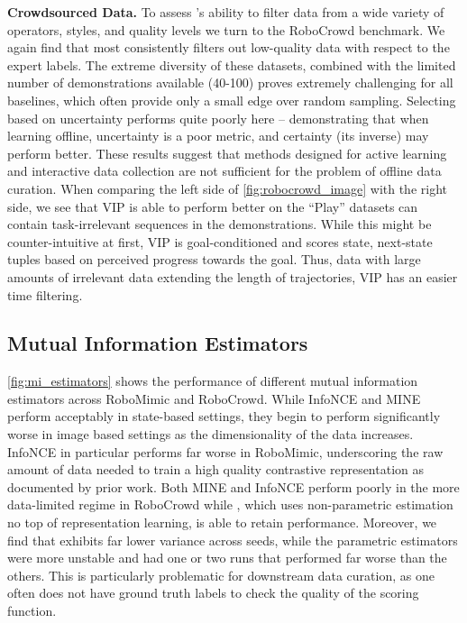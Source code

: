 \noindent \textbf{Crowdsourced Data.}
To assess \abv's ability to filter data from a wide variety of operators, styles, and quality levels we turn to the RoboCrowd benchmark. We again find that \abv most consistently filters out low-quality data with respect to the expert labels. The extreme diversity of these datasets, combined with the limited number of demonstrations available (40-100) proves extremely challenging for all baselines, which often provide only a small edge over random sampling. Selecting based on uncertainty performs quite poorly here -- demonstrating that when learning offline, uncertainty is a poor metric, and certainty (its inverse) may perform better. These results suggest that methods designed for active learning and interactive data collection are not sufficient for the problem of offline data curation. When comparing the left side of \cref{fig:robocrowd_image} with the right side, we see that VIP is able to perform better on the ``Play'' datasets can contain task-irrelevant sequences in the demonstrations. While this might be counter-intuitive at first, VIP is goal-conditioned and scores state, next-state tuples based on perceived progress towards the goal. Thus, data with large amounts of irrelevant data extending the length of trajectories, VIP has an easier time filtering. 


\subsection{Mutual Information Estimators}


\cref{fig:mi_estimators} shows the performance of different mutual information estimators across RoboMimic and RoboCrowd. While InfoNCE and MINE perform acceptably in state-based settings, they begin to perform significantly worse in image based settings as the dimensionality of the data increases. InfoNCE in particular performs far worse in RoboMimic, underscoring the raw amount of data needed to train a high quality contrastive representation as documented by prior work. Both MINE and InfoNCE perform poorly in the more data-limited regime in RoboCrowd while \abv, which uses non-parametric estimation no top of representation learning, is able to retain performance. Moreover, we find that \abv exhibits far lower variance across seeds, while the parametric estimators were more unstable and had one or two runs that performed far worse than the others. This is particularly problematic for downstream data curation, as one often does not have ground truth labels to check the quality of the scoring function. 

